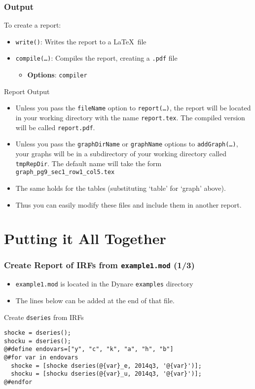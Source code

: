 \documentclass[10pt]{beamer}
\newcommand{\myitem}{\item[$\bullet$]}
\begin{document}
\begin{frame}[fragile,t]
  \frametitle{Output}
  To create a report:
  \begin{itemize}
  \myitem \texttt{write()}: Writes the report to a \LaTeX\ file
  \myitem \texttt{compile(\ldots)}: Compiles the report, creating a \texttt{.pdf} file
    \begin{itemize}
    \myitem \textbf{Options}: \texttt{compiler}
    \end{itemize}
  \end{itemize}
  Report Output
  \begin{itemize}
  \myitem Unless you pass the \texttt{fileName} option to \texttt{report(\ldots)}, the report will be located in your working directory with the name \texttt{report.tex}. The compiled version will be called \texttt{report.pdf}.
  \myitem Unless you pass the \texttt{graphDirName} or \texttt{graphName} options to \texttt{addGraph(\ldots)}, your graphs will be in a subdirectory of your working directory called \texttt{tmpRepDir}. The default name will take the form \texttt{graph\_pg9\_sec1\_row1\_col5.tex}
  \myitem The same holds for the tables (substituting `table' for `graph' above).
  \myitem Thus you can easily modify these files and include them in another report.
  \end{itemize}
\end{frame}


\section{Putting it All Together}
\begin{frame}[fragile=singleslide,t]
  \frametitle{Create Report of IRFs from \texttt{example1.mod} (1/3)}
  \begin{itemize}
  \myitem \texttt{example1.mod} is located in the Dynare \texttt{examples} directory
  \myitem The lines below can be added at the end of that file.
  \end{itemize}
  \begin{block}{Create \texttt{dseries} from IRFs}
\begin{verbatim}
shocke = dseries();
shocku = dseries();
@#define endovars=["y", "c", "k", "a", "h", "b"]
@#for var in endovars
  shocke = [shocke dseries(@{var}_e, 2014q3, '@{var}')];
  shocku = [shocku dseries(@{var}_u, 2014q3, '@{var}')];
@#endfor
\end{verbatim}
  \end{block}
\end{frame}
\end{document}
